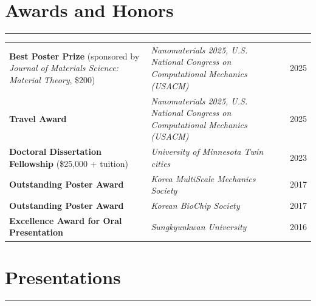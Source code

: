 \documentclass[11pt]{article}
\begin{document}
\section*{Awards and Honors} \vspace{-0.7em}
\hrule
\vspace{1.0em}
\renewcommand{\arraystretch}{1.2} %
\begin{tabularx}{\textwidth}{@{} l X r @{}}
    \parbox[t]{0.4\textwidth}{\textbf{Best Poster Prize }\\ 
    (sponsored by \textit{Journal of Materials Science: Material Theory}, \$200)} & \textit{Nanomaterials 2025, U.S. National Congress on Computational Mechanics (USACM)} & 2025 \\
    \textbf{Travel Award} & \textit{Nanomaterials 2025, U.S. National Congress on Computational Mechanics (USACM)} & 2025 \\
    \parbox[t]{0.4\textwidth}{\textbf{Doctoral Dissertation Fellowship} \\ (\$25,000 + tuition)} & \textit{University of Minnesota Twin cities} & 2023 \\
    \textbf{Outstanding Poster Award} & \textit{Korea MultiScale Mechanics Society} & 2017 \\
    \textbf{Outstanding Poster Award} & \textit{Korean BioChip Society} & 2017 \\
    \textbf{Excellence Award for Oral Presentation} & \textit{Sungkyunkwan University} & 2016 \\
\end{tabularx}
\renewcommand{\arraystretch}{1.0} %





\newpage
\section*{Presentations}\vspace{-0.7em}
\hrule
\vspace{1.5em}
\printbibliography[heading=none,resetnumbers=true,keyword=presentation]

\newpage
\end{document}
